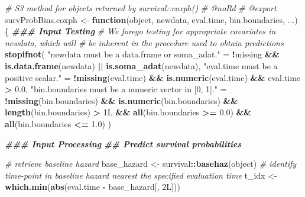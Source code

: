 \documentclass[
]{book}
\newenvironment{Shaded}{\begin{snugshade}}{\end{snugshade}}
\newcommand{\CommentTok}[1]{\textcolor[rgb]{0.56,0.35,0.01}{\textit{#1}}}
\newcommand{\ControlFlowTok}[1]{\textcolor[rgb]{0.13,0.29,0.53}{\textbf{#1}}}
\newcommand{\DocumentationTok}[1]{\textcolor[rgb]{0.56,0.35,0.01}{\textbf{\textit{#1}}}}
\newcommand{\FloatTok}[1]{\textcolor[rgb]{0.00,0.00,0.81}{#1}}
\newcommand{\FunctionTok}[1]{\textcolor[rgb]{0.13,0.29,0.53}{\textbf{#1}}}
\newcommand{\NormalTok}[1]{#1}
\newcommand{\OtherTok}[1]{\textcolor[rgb]{0.56,0.35,0.01}{#1}}
\newcommand{\SpecialCharTok}[1]{\textcolor[rgb]{0.81,0.36,0.00}{\textbf{#1}}}
\newcommand{\StringTok}[1]{\textcolor[rgb]{0.31,0.60,0.02}{#1}}
\begin{document}
\begin{Shaded}
\begin{Highlighting}[]
\CommentTok{\#\textquotesingle{} S3 method for objects returned by \textasciigrave{}survival::coxph()\textasciigrave{}}
\CommentTok{\#\textquotesingle{} @noRd}
\CommentTok{\#\textquotesingle{} @export}
\NormalTok{survProbBins.coxph }\OtherTok{\textless{}{-}} \ControlFlowTok{function}\NormalTok{(object, newdata, eval.time, bin.boundaries, ...) \{}
  \DocumentationTok{\#\#\# Input Testing}
  \CommentTok{\# We forego testing for appropriate covariates in \textasciigrave{}newdata\textasciigrave{}, which will}
  \CommentTok{\#   be inherent in the procedure used to obtain predictions}
  \FunctionTok{stopifnot}\NormalTok{(}
    \StringTok{"\textasciigrave{}newdata\textasciigrave{} must be a data.frame or soma\_adat."} \OtherTok{=} 
      \SpecialCharTok{!}\NormalTok{missing }\SpecialCharTok{\&\&} \FunctionTok{is.data.frame}\NormalTok{(newdata) }\SpecialCharTok{||} \FunctionTok{is.soma\_adat}\NormalTok{(newdata),}
    \StringTok{"\textasciigrave{}eval.time\textasciigrave{} must be a positive scalar."} \OtherTok{=} 
      \SpecialCharTok{!}\FunctionTok{missing}\NormalTok{(eval.time) }\SpecialCharTok{\&\&} \FunctionTok{is.numeric}\NormalTok{(eval.time) }\SpecialCharTok{\&\&}\NormalTok{ eval.time }\SpecialCharTok{\textgreater{}} \FloatTok{0.0}\NormalTok{,}
    \StringTok{"\textasciigrave{}bin.boundaries\textasciigrave{} must be a numeric vector in [0, 1]."} \OtherTok{=} 
      \SpecialCharTok{!}\FunctionTok{missing}\NormalTok{(bin.boundaries) }\SpecialCharTok{\&\&} \FunctionTok{is.numeric}\NormalTok{(bin.boundaries) }\SpecialCharTok{\&\&}
      \FunctionTok{length}\NormalTok{(bin.boundaries) }\SpecialCharTok{\textgreater{}}\NormalTok{ 1L }\SpecialCharTok{\&\&} \FunctionTok{all}\NormalTok{(bin.boundaries }\SpecialCharTok{\textgreater{}=} \FloatTok{0.0}\NormalTok{) }\SpecialCharTok{\&\&} 
      \FunctionTok{all}\NormalTok{(bin.boundaries }\SpecialCharTok{\textless{}=} \FloatTok{1.0}\NormalTok{)}
\NormalTok{  )}
  
  \DocumentationTok{\#\#\# Input Processing}
  \DocumentationTok{\#\# Predict survival probabilities}
  
  \CommentTok{\# retrieve baseline hazard}
\NormalTok{  base\_hazard }\OtherTok{\textless{}{-}}\NormalTok{ survival}\SpecialCharTok{::}\FunctionTok{basehaz}\NormalTok{(object)}
  \CommentTok{\# identify time{-}point in baseline hazard nearest the specified evaluation time}
\NormalTok{  t\_idx       }\OtherTok{\textless{}{-}} \FunctionTok{which.min}\NormalTok{(}\FunctionTok{abs}\NormalTok{(eval.time }\SpecialCharTok{{-}}\NormalTok{ base\_hazard[, 2L]))}
  

\end{Highlighting}
\end{Shaded}
\end{document}
